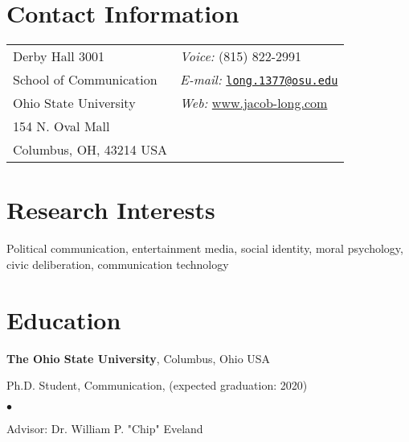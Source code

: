 \documentclass[margin,line]{res}
\newenvironment{list1}{
  \begin{list}{\ding{113}}{%
      \setlength{\itemsep}{0in}
      \setlength{\parsep}{0in} \setlength{\parskip}{0in}
      \setlength{\topsep}{0in} \setlength{\partopsep}{0in} 
      \setlength{\leftmargin}{0.17in}}}{\end{list}}
\newenvironment{list2}{
  \begin{list}{$\bullet$}{%
      \setlength{\itemsep}{0in}
      \setlength{\parsep}{0in} \setlength{\parskip}{0in}
      \setlength{\topsep}{0in} \setlength{\partopsep}{0in} 
      \setlength{\leftmargin}{0.2in}}}{\end{list}}
\begin{document}

\begin{resume}
\section{\sc Contact Information}
\vspace{.05in}
\begin{tabular}{@{}p{2in}p{4in}}
Derby Hall 3001           & {\it Voice:}  (815) 822-2991 \\            
School of Communication & {\it E-mail:}  \href{mailto:long.1377@osu.edu}{\nolinkurl{long.1377@osu.edu}}\\         
Ohio State University & {\it Web:} \url{www.jacob-long.com}\\ 
154 N. Oval Mall \\      
Columbus, OH, 43214 USA \\     
\end{tabular}


\section{\sc Research Interests}
Political communication, entertainment media, social identity, moral psychology,\\ civic deliberation, communication technology

\section{\sc Education}
{\bf The Ohio State University}, Columbus, Ohio USA\\
\vspace*{-.1in}
\begin{list1}
\item[] Ph.D. Student, Communication, (expected graduation: 2020)
\begin{list2}
\vspace*{.05in}
\item Advisor: Dr. William P. "Chip" Eveland
\end{list2}
\end{list1}


\end{resume}
\end{document}
